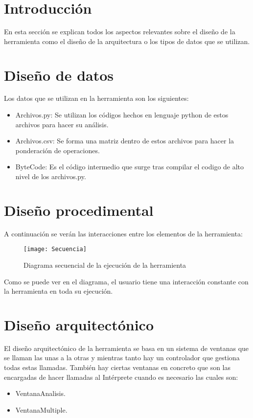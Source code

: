 
\section{Introducción}
En esta sección se explican todos los aspectos relevantes sobre el diseño de la herramienta como el diseño de la arquitectura o los tipos de datos que se utilizan.

\section{Diseño de datos}
Los datos que se utilizan en la herramienta son los siguientes:
\begin{itemize}
	\item Archivos.py: Se utilizan los códigos hechos en lenguaje python de estos archivos para hacer su análisis.
	\item Archivos.csv: Se forma una matriz dentro de estos archivos para hacer la ponderación de operaciones. 
	\item ByteCode: Es el código intermedio que surge tras compilar el codigo de alto  nivel de los archivos.py.
	
\end{itemize}


\section{Diseño procedimental}
A continuación se verán las interacciones entre los elementos de la herramienta:

\begin{figure}[H]
\centering
\texttt{[image: Secuencia]}
\caption{Diagrama secuencial de la ejecución de la herramienta}
\end{figure}



Como se puede ver en el diagrama, el usuario tiene una interacción constante con la herramienta en toda su ejecución.
\section{Diseño arquitectónico}
El diseño arquitectónico de la herramienta se basa en un sistema de ventanas que se llaman las unas a la otras y mientras tanto hay un controlador que gestiona todas estas llamadas.
También hay ciertas ventanas en concreto que son las encargadas de hacer llamadas al Intérprete cuando es  necesario las cuales son:

\begin{itemize}
	\item VentanaAnalisis.
	\item VentanaMultiple. 	
\end{itemize}

